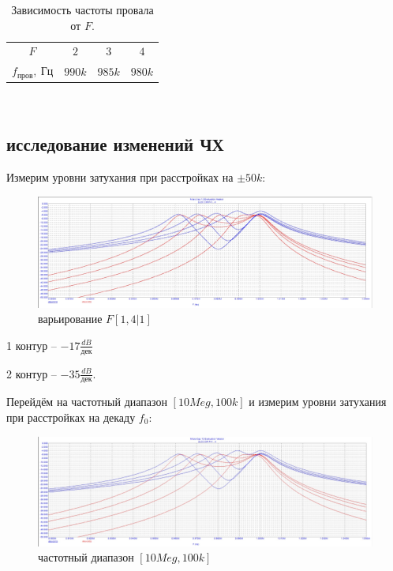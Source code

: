 \documentclass[a4paper, 14pt]{extarticle}%
\begin{document}
\begin{table}[h]
	\caption{Зависимость частоты провала от $F$. }
	\label{t3}
	\begin{tabular}{c|ccc} 
		$F$               & $2$    & $3$    & $4$    \\ 
		$f_{\text{пров}},~\text{Гц}$ & $990k$ & $985k$ & $980k$ \\ 
	\end{tabular}
\end{table}

~

\subsection{исследование изменений ЧХ}

Измерим уровни затухания при расстройках на $\pm 50k$:

\begin{figure}[h!]
	\centering
			\includegraphics[width=1.1\linewidth]{2.2_varF.jpg}
            \caption{варьирование $F  [1,4|1]$}
	\label{A}
\end{figure}

1 контур -- $-17 \frac{dB}{\text{дек}}$

2 контур -- $-35 \frac{dB}{\text{дек}}$.

Перейдём на частотный диапазон $[10Meg,100k]$ и измерим уровни затухания при расстройках на декаду $f_0$:

\begin{figure}[h!]
	\centering
			\includegraphics[width=1.1\linewidth]{2.2_freq_range.jpg}
            \caption{частотный диапазон $[10Meg, 100k]$}
	\label{A}
\end{figure}
\end{document}
